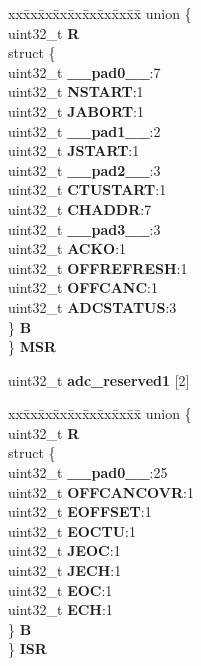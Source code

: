 \begin{DoxyCompactItemize}
\begin{tabbing}
\end{tabbing}\item 
\mbox{\label{structADC__tag_a809c436c819a4fdec8047663c4aff0e4}} 
\begin{tabbing}
xx\=xx\=xx\=xx\=xx\=xx\=xx\=xx\=xx\=\kill
union \{\\
\>uint32\_t {\bfseries R}\\
\>struct \{\\
\>\>uint32\_t {\bfseries \_\_pad0\_\_}:7\\
\>\>uint32\_t {\bfseries NSTART}:1\\
\>\>uint32\_t {\bfseries JABORT}:1\\
\>\>uint32\_t {\bfseries \_\_pad1\_\_}:2\\
\>\>uint32\_t {\bfseries JSTART}:1\\
\>\>uint32\_t {\bfseries \_\_pad2\_\_}:3\\
\>\>uint32\_t {\bfseries CTUSTART}:1\\
\>\>uint32\_t {\bfseries CHADDR}:7\\
\>\>uint32\_t {\bfseries \_\_pad3\_\_}:3\\
\>\>uint32\_t {\bfseries ACKO}:1\\
\>\>uint32\_t {\bfseries OFFREFRESH}:1\\
\>\>uint32\_t {\bfseries OFFCANC}:1\\
\>\>uint32\_t {\bfseries ADCSTATUS}:3\\
\>\} {\bfseries B}\\
\} {\bfseries MSR}\\

\end{tabbing}\item 
\mbox{\label{structADC__tag_a4f1b1136efebe3e3eecbcf0611d0953d}} 
uint32\+\_\+t {\bfseries adc\+\_\+reserved1} \mbox{[}2\mbox{]}
\item 
\mbox{\label{structADC__tag_abf230cda48e5610090110ece46eb95b7}} 
\begin{tabbing}
xx\=xx\=xx\=xx\=xx\=xx\=xx\=xx\=xx\=\kill
union \{\\
\>uint32\_t {\bfseries R}\\
\>struct \{\\
\>\>uint32\_t {\bfseries \_\_pad0\_\_}:25\\
\>\>uint32\_t {\bfseries OFFCANCOVR}:1\\
\>\>uint32\_t {\bfseries EOFFSET}:1\\
\>\>uint32\_t {\bfseries EOCTU}:1\\
\>\>uint32\_t {\bfseries JEOC}:1\\
\>\>uint32\_t {\bfseries JECH}:1\\
\>\>uint32\_t {\bfseries EOC}:1\\
\>\>uint32\_t {\bfseries ECH}:1\\
\>\} {\bfseries B}\\
\} {\bfseries ISR}\\


\end{tabbing}
\end{DoxyCompactItemize}
